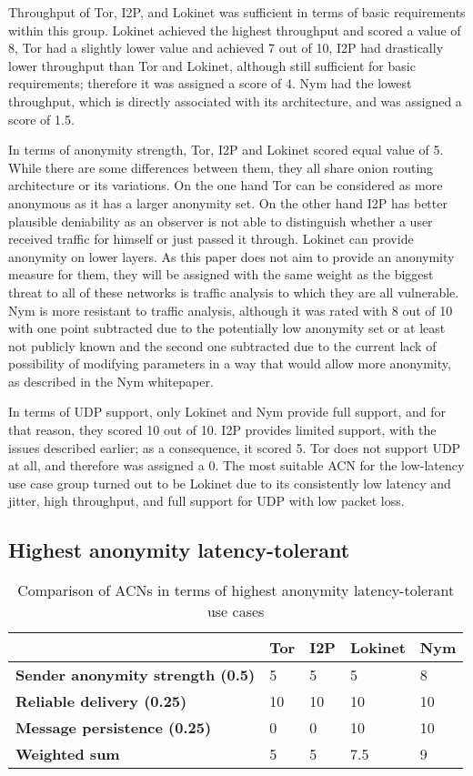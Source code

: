 Throughput of Tor, I2P, and Lokinet was sufficient in terms of basic requirements within this group. Lokinet achieved the highest throughput and scored a value of 8, Tor had a slightly lower value and achieved 7 out of 10, I2P had drastically lower throughput than Tor and Lokinet, although still sufficient for basic requirements; therefore it was assigned a score of 4. Nym had the lowest throughput, which is directly associated with its architecture, and was assigned a score of 1.5.

In terms of anonymity strength, Tor, I2P and Lokinet scored equal value of 5. While there are some differences between them, they all share onion routing architecture or its variations. On the one hand Tor can be considered as more anonymous as it has a larger anonymity set. On the other hand I2P has better plausible deniability as an observer is not able to distinguish whether a user received traffic for himself or just passed it through. Lokinet can provide anonymity on lower layers. As this paper does not aim to provide an anonymity measure for them, they will be assigned with the same weight as the biggest threat to all of these networks is traffic analysis to which they are all vulnerable. Nym is more resistant to traffic analysis, although it was rated with 8 out of 10 with one point subtracted due to the potentially low anonymity set or at least not publicly known and the second one subtracted due to the current lack of possibility of modifying parameters in a way that would allow more anonymity, as described in the Nym whitepaper.

In terms of UDP support, only Lokinet and Nym provide full support, and for that reason, they scored 10 out of 10. I2P provides limited support, with the issues described earlier; as a consequence, it scored 5. Tor does not support UDP at all, and therefore was assigned a 0.
The most suitable ACN for the low-latency use case group turned out to be Lokinet due to its consistently low latency and jitter, high throughput, and full support for UDP with low packet loss.

\subsection{Highest anonymity latency-tolerant}

\begin{table}[!ht]
\caption{Comparison of ACNs in terms of highest anonymity latency-tolerant use cases}
\label{tab:high_latency_uc}
\small
\begin{tabular}{|p{}|p{}|p{}|p{}|p{}|}
\hline
\textbf{} & \textbf{Tor} & \textbf{I2P} & \textbf{Lokinet} & \textbf{Nym} \\
\hline
\textbf{Sender anonymity strength (0.5)} & 5 & 5 & 5 & 8 \\
\hline
\textbf{Reliable delivery (0.25)} & 10 & 10 & 10 & 10 \\
\hline
\textbf{Message persistence (0.25)} & 0 & 0 & 10 & 10 \\
\hline
\textbf{Weighted sum} & 5 & 5 & 7.5 & 9 \\
\hline
\end{tabular}
\end{table}

